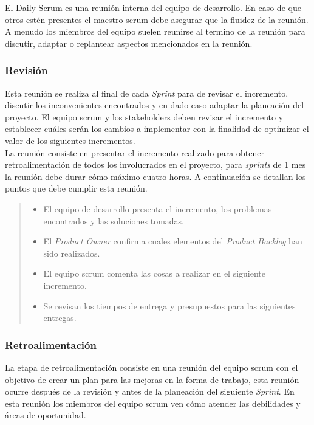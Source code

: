  \noindent El Daily Scrum es una reunión interna del equipo de desarrollo. En caso de que otros estén presentes
 el maestro scrum debe asegurar que la fluidez de la reunión. A menudo los miembros del equipo suelen reunirse
 al termino de la reunión para discutir, adaptar o replantear aspectos mencionados en la reunión.

\subsubsection{Revisión}

 Esta reunión se realiza al final de cada {\it Sprint} para de revisar el incremento, discutir los inconvenientes
 encontrados y en dado caso adaptar la planeación del proyecto. El equipo scrum y los stakeholders deben
 revisar el incremento y establecer cuáles serán los cambios a implementar con la finalidad de optimizar el valor
 de los siguientes incrementos.\\

 \noindent La reunión consiste en presentar el incremento realizado para obtener retroalimentación de todos
 los involucrados en el proyecto, para {\it sprints} de 1 mes la reunión debe durar cómo máximo cuatro horas.
 A continuación se detallan los puntos que debe cumplir esta reunión.

    \begin{quote}
    \begin{itemize}
    \item El equipo de desarrollo presenta el incremento, los problemas encontrados y las soluciones
            tomadas.

    \item El {\it Product Owner} confirma cuales elementos del {\it Product Backlog} han sido realizados.
    \item El equipo scrum comenta las cosas a realizar en el siguiente incremento.
    \item Se revisan los tiempos de entrega y presupuestos para las siguientes entregas.
    \end{itemize}
    \end{quote}


\subsubsection{Retroalimentación}

 La etapa de retroalimentación consiste en una reunión del equipo scrum con el objetivo de crear un plan para
 las mejoras en la forma de trabajo, esta reunión ocurre después de la revisión y antes de la planeación del
 siguiente {\it Sprint}. En esta reunión los miembros del equipo scrum ven cómo atender las debilidades y áreas
 de oportunidad.\\

